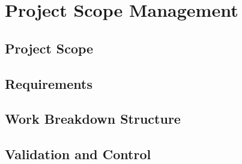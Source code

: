 \chapter{Project Scope Management}

\section{Project Scope}

\section{Requirements}

\section{Work Breakdown Structure}

\section{Validation and Control}